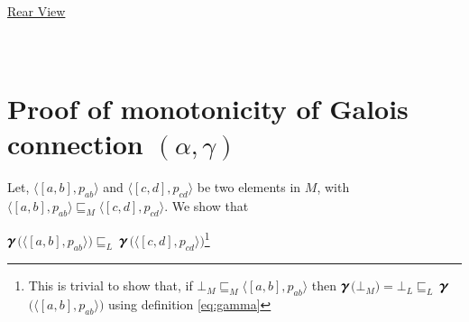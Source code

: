 \documentclass[final,3p, review, times]{Elsevier/elsarticle}
\newcommand{\GAMMA}{\large\boldsymbol{\gamma}\normalsize}
\begin{document}
\\\\\\\\\\\\\\\\\\\\\\\\\\\\\\\\\\\\\\\\\\\\\\\\\\\\\
\centerline{\underline{\Large{Rear View}}}
\newpage








\section{\\Proof of monotonicity of Galois connection $(\alpha,\gamma)$}
\label{app:monotonicity}

Let, $\langle[a,b],p_{ab}\rangle$ and $\langle[c,d],p_{cd}\rangle$ be two elements in $M$, with $\langle[a,b],p_{ab}\rangle\sqsubseteq_M\langle[c,d],p_{cd}\rangle$. We show that

\centerline{
  $\GAMMA$$\Big(\langle[a,b],p_{ab}\rangle\Big)\sqsubseteq_L\ $$\GAMMA$$\Big(\langle[c,d],p_{cd}\rangle\Big)$\footnote{This is trivial to show that, if $\bot_M\sqsubseteq_M\langle[a,b],p_{ab}\rangle$ then $\GAMMA$$\Big(\bot_M\Big)=\bot_L\sqsubseteq_L\ $$\GAMMA$$\Big(\langle[a,b],p_{ab}\rangle\Big)$ using definition \ref{eq:gamma}}
}
\end{document}
